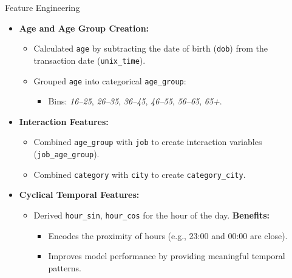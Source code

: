 \documentclass{beamer}
\begin{document}
\begin{frame}{Feature Engineering}
    \begin{itemize}
        \item \textbf{Age and Age Group Creation:}
        \begin{itemize}
            \item Calculated \texttt{age} by subtracting the date of birth (\texttt{dob}) from the transaction date (\texttt{unix\_time}).
            \item Grouped \texttt{age} into categorical \texttt{age\_group}:
            \begin{itemize}
                \item Bins: \textit{16–25}, \textit{26–35}, \textit{36–45}, \textit{46–55}, \textit{56–65}, \textit{65+}.
            \end{itemize}
        \end{itemize}
        \item \textbf{Interaction Features:}
        \begin{itemize}
            \item Combined \texttt{age\_group} with \texttt{job} to create interaction variables (\texttt{job\_age\_group}).
            \item Combined \texttt{category} with \texttt{city} to create \texttt{category\_city}.
        \end{itemize}
        \item \textbf{Cyclical Temporal Features:}
        \begin{itemize}
            \item Derived \texttt{hour\_sin}, \texttt{hour\_cos} for the hour of the day.
            \textbf{Benefits:}
            \begin{itemize}
                \item Encodes the proximity of hours (e.g., 23:00 and 00:00 are close).
                \item Improves model performance by providing meaningful temporal patterns.
            \end{itemize}
        \end{itemize}
    \end{itemize}
\end{frame}
\end{document}
